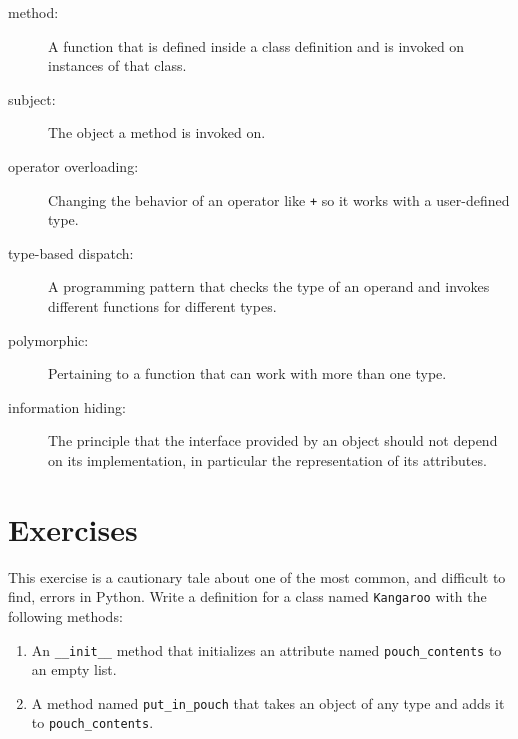 \documentclass[10pt]{book}
\begin{document}
\begin{CJK}{UTF8}{gbsn}
\begin{description}
\item[method:] A function that is defined inside a class definition and
is invoked on instances of that class.

\item[subject:] The object a method is invoked on.

\item[operator overloading:] Changing the behavior of an operator like
{\tt +} so it works with a user-defined type.

\item[type-based dispatch:] A programming pattern that checks the type
of an operand and invokes different functions for different types.

\item[polymorphic:] Pertaining to a function that can work with more
  than one type.  

\item[information hiding:] The principle that the interface provided 
by an object should not depend on its implementation, in particular
the representation of its attributes.


\end{description}

\section{Exercises}

\begin{exercise}

This exercise is a cautionary tale about one of the most
common, and difficult to find, errors in Python.
Write a definition for a class named {\tt Kangaroo} with the following
methods:

\begin{enumerate}

\item An \verb"__init__" method that initializes an attribute named 
\verb"pouch_contents" to an empty list.

\item A method named \verb"put_in_pouch" that takes an object
of any type and adds it to \verb"pouch_contents".


\end{enumerate}
\end{exercise}
\end{CJK}
\end{document}
